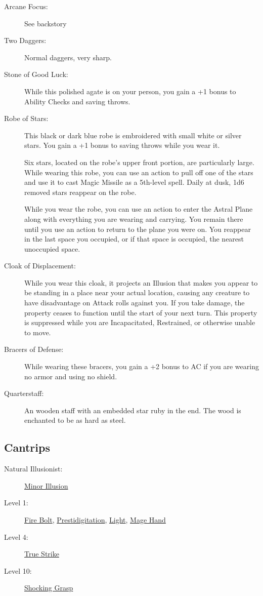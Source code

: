 \documentclass[letterpaper,10pt,twoside,twocolumn,openany]{book}
\begin{document}
\begin{description}
	\item[Arcane Focus:] See backstory
	\item[Two Daggers:] Normal daggers, very sharp.
	\item[Stone of Good Luck:] While this polished agate is on your person, you gain a +1 bonus to Ability Checks and saving throws.
	\item[Robe of Stars:] This black or dark blue robe is embroidered with small white or silver stars. You gain a +1 bonus to saving throws while you wear it.
	
	Six stars, located on the robe's upper front portion, are particularly large. While wearing this robe, you can use an action to pull off one of the stars and use it to cast Magic Missile as a 5th-level spell. Daily at dusk, 1d6 removed stars reappear on the robe.
	
	While you wear the robe, you can use an action to enter the Astral Plane along with everything you are wearing and carrying. You remain there until you use an action to return to the plane you were on. You reappear in the last space you occupied, or if that space is occupied, the nearest unoccupied space.
	\item[Cloak of Displacement:] While you wear this cloak, it projects an Illusion that makes you appear to be standing in a place near your actual location, causing any creature to have disadvantage on Attack rolls against you. If you take damage, the property ceases to function until the start of your next turn. This property is suppressed while you are Incapacitated, Restrained, or otherwise unable to move.
	\item[Bracers of Defense:] While wearing these bracers, you gain a +2 bonus to AC if you are wearing no armor and using no shield.
	\item[Quarterstaff:] An wooden staff with an embedded star ruby in the end. The wood is enchanted to be as hard as steel.
\end{description}

\subsection{Cantrips}

\begin{description}
	\item[Natural Illusionist:] \hyperlink{Minor Illusion}{Minor Illusion}
	\item[Level 1:] \hyperlink{Fire Bolt}{Fire Bolt}, \hyperlink{Prestidigitation}{Prestidigitation}, \hyperlink{Light}{Light}, \hyperlink{Mage Hand}{Mage Hand}
	\item[Level 4:] \hyperlink{True Strike}{True Strike}
	\item[Level 10:] \hyperlink{Shocking Grasp}{Shocking Grasp}
\end{description}
\end{document}
